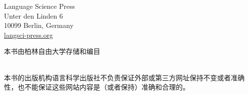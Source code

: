 {\bigskip

Language Science Press\\
Unter den Linden 6\\
10099 Berlin, Germany\\
\href{http://langsci-press.org}{langsci-press.org}

\vfill

本书由柏林自由大学存储和编目 \\[3ex]

\\[3ex]

\vfill

\noindent
本书的出版机构语言科学出版社不负责保证外部或第三方网址保持不变或者准确性，也不能保证这些网站内容是（或者保持）准确和合理的。
}


\makeatother



\newcommand{\mytrans}[1]{\trans\quotetrans{#1}}

\newcommand{\quotetrans}[1]{‘#1’}







